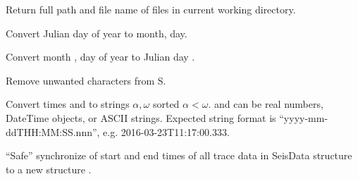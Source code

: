 \documentclass[letterpaper,11pt,english]{sphinxmanual}
\begin{document}
\begin{fulllineitems}
\end{fulllineitems}


Return full path and file name of files in current working directory.

\begin{fulllineitems}
\label{\detokenize{src/Appendices/function_list:j2md}}
\end{fulllineitems}


Convert Julian day  of year  to month, day.

\begin{fulllineitems}
\label{\detokenize{src/Appendices/function_list:md2j}}
\end{fulllineitems}


Convert month , day  of year  to Julian day .

Remove unwanted characters from S.

\begin{fulllineitems}
\label{\detokenize{src/Appendices/function_list:parsetimewin}}
\end{fulllineitems}


Convert times  and  to strings \(\alpha, \omega\) sorted \(\alpha < \omega\).
 and  can be real numbers, DateTime objects, or ASCII strings.
Expected string format is “yyyy-mm-ddTHH:MM:SS.nnn”, e.g. 2016-03-23T11:17:00.333.

“Safe” synchronize of start and end times of all trace data in SeisData structure  to a new structure .


\begin{fulllineitems}
\end{fulllineitems}
\end{document}
